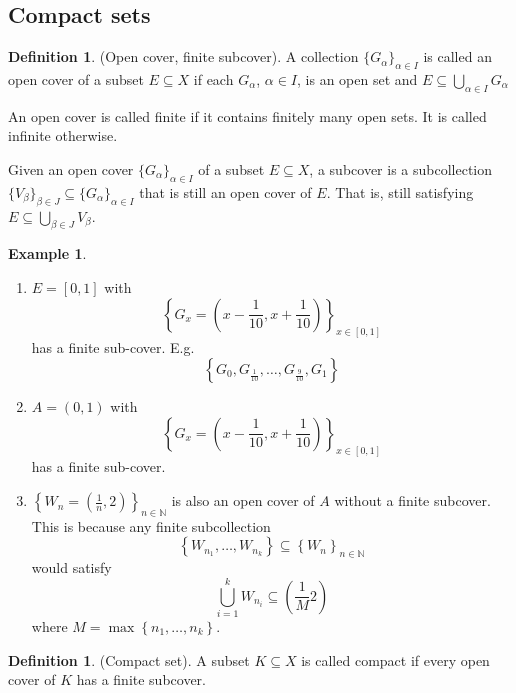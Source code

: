 \documentclass[10pt]{article}
\theoremstyle{definition}
\newtheorem{definition}[theorem]{Definition}
\newtheorem{example}[theorem]{Example}
\theoremstyle{remark}
\begin{document}
\subsection{Compact sets}

\begin{definition}
    (Open cover, finite subcover).
    A collection $\{G_\alpha\}_{\alpha \in I}$ is called an open cover of a subset $E\subseteq X$ if each $G_\alpha$, $\alpha \in I$, is an open set and $E \subseteq \bigcup_{\alpha \in I} G_\alpha$

    An open cover is called finite if it contains finitely many open sets.
    It is called infinite otherwise.

    Given an open cover $\{G_\alpha\}_{\alpha \in I}$ of a subset $E\subseteq X$, a subcover is a subcollection 
    $\{V_\beta\}_{\beta \in J} \subseteq \{G_\alpha\}_{\alpha \in I}$ that is still an open cover of $E$.
    That is, still satisfying $E \subseteq \bigcup_{\beta \in J} V_\beta$.
\end{definition}
\begin{example}
    \hfill
    \begin{enumerate}
        \item $E = [0, 1]$ with
            $$\left\{G_x = \left(x - \frac{1}{10}, x + \frac{1}{10}\right)\right\}_{x \in [0, 1]}$$ has a finite sub-cover. E.g.
            $$\left\{G_0, G_{\frac{1}{10}}, \ldots, G_{\frac{9}{10}}, G_1\right\}$$
        \item $A = (0, 1)$ with
            $$\left\{G_x = \left(x - \frac{1}{10}, x + \frac{1}{10}\right)\right\}_{x \in [0, 1]}$$ has a finite sub-cover.
        \item $\left\{W_n = \left(\frac{1}{n}, 2\right)\right\}_{n \in \mathbb{N}}$ is also an open cover of $A$ without a finite subcover. This is because any finite subcollection
            $$\left\{W_{n_1}, \ldots, W_{n_k}\right\} \subseteq \left\{W_n\right\}_{n \in \mathbb{N}}$$
            would satisfy
            $$\bigcup_{i=1}^k W_{n_i} \subseteq \left(\frac{1}{M} 2\right)$$
            where $M = \max\left\{n_1, \ldots, n_k\right\}$.
    \end{enumerate}
\end{example}
\begin{definition}
    (Compact set).
    A subset $K \subseteq X$ is called compact if every open cover of $K$ has a finite subcover.
\end{definition}
\end{document}
